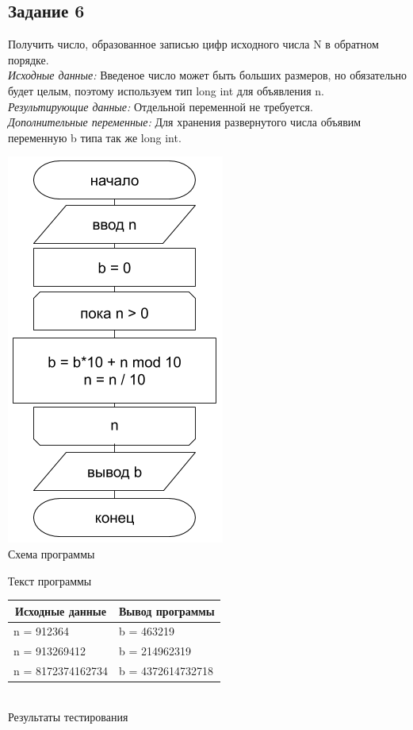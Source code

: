 \documentclass[a4paper,14pt]{extarticle}
\begin{document}
\subsection{Задание 6}
Получить число, образованное записью цифр исходного числа N в обратном порядке.\\
\textit{Исходные данные:} Введеное число может быть больших размеров, но обязательно будет целым, поэтому используем тип long int для объявления n.\\
\textit{Результирующие данные:} Отдельной переменной не требуется.\\
\textit{Дополнительные переменные:} Для хранения развернутого числа объявим переменную b типа так же long int.\\
\begin{center}
\includegraphics[scale=0.6]{lab2-6.png}\\
Схема программы
\end{center}

\begin{center}
Текст программы
\end{center}
\begin{center}
\begin{tabular}{|l|l|}
\hline
\multicolumn{1}{|c|}{Исходные данные}& \multicolumn{1}{|c|}{Вывод программы}\\
\hline
n = 912364 & b = 463219\\
n = 913269412 & b = 214962319\\
n = 8172374162734 & b = 4372614732718\\
\hline
\end{tabular}\\
\vspace{0.3cm}
Результаты тестирования
\end{center}
\end{document}
